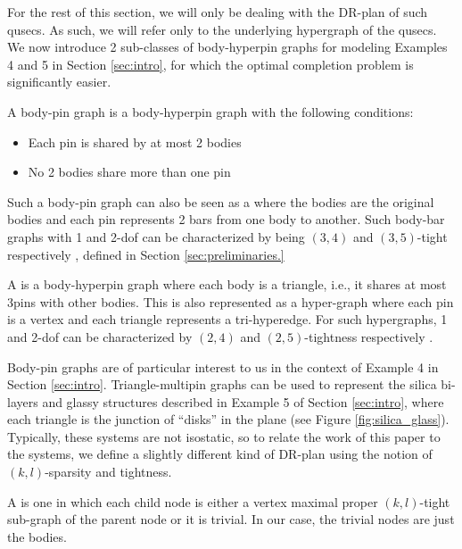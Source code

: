 For the rest of this section, we will only be dealing with the DR-plan of
such qusecs. As such, we will refer only to the underlying hypergraph of the qusecs. We now
introduce 2 sub-classes of body-hyperpin graphs for modeling Examples 4 and
5 in Section \ref{sec:intro}, for which the optimal completion problem is
significantly easier.

\begin{definition}
\label{def:body-pin}
    A body-pin graph is a body-hyperpin graph with the following conditions:
    \begin{itemize}
        \item Each pin is shared by at most 2 bodies
        \item No 2 bodies share more than one pin
    \end{itemize}
    Such a body-pin graph can also be seen as a  where
    the bodies are the original bodies and each pin represents 2 bars from
    one body to another. Such body-bar graphs with 1 and 2-dof can be
    characterized by being $(3,4)$ and $(3,5)$-tight respectively
    \cite{Lee:2007:PGA} \cite{streinu2009sparse},
defined in Section  \ref{sec:preliminaries.}
\end{definition}

\begin{definition}
    A  is a body-hyperpin graph where each body
    is a triangle, i.e., it shares at most 3pins with other bodies. This is also represented as a hyper-graph where each pin is a vertex and each triangle represents a tri-hyperedge. For such hypergraphs, 1 and 2-dof can be characterized by $(2,4)$ and $(2,5)$-tightness respectively \cite{Lee:2007:PGA} \cite{streinu2009sparse}.
\end{definition}

Body-pin graphs are of particular interest to us in the context of Example 4
in Section \ref{sec:intro}. Triangle-multipin graphs can be used to
represent the silica bi-layers and glassy structures described in Example 5
of Section \ref{sec:intro}, where each triangle is the junction of ``disks''
in the plane (see Figure \ref{fig:silica_glass}). Typically, these systems
are not isostatic, so to relate the work of this paper to the systems, we
define a slightly different kind of DR-plan using the notion of
$(k,l)$-sparsity and tightness.

\begin{definition}
    A  is one in which each child node is either a vertex maximal proper $(k,l)$-tight sub-graph of the parent node or it is trivial. In our case, the trivial nodes are just the bodies.
\end{definition}

